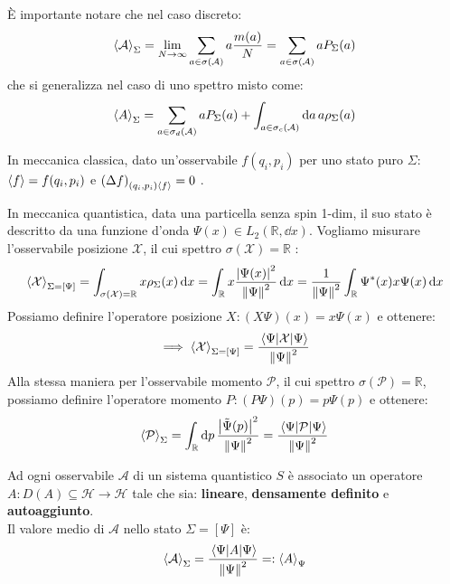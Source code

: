 È importante notare che nel caso discreto: 
\begin{equation}
    \expval{\mathcal{A}}_\Sigma = \lim_{N\to \infty} \sum_{a \in \sigma(\mathcal{A})} a \frac{m(a)}{N} = \sum_{a \in \sigma(\mathcal{A})} a P_\Sigma(a)
\end{equation}
che si generalizza nel caso di uno spettro misto come:
\begin{equation}
    \expval{A}_\Sigma = \sum_{a \in \sigma_d(\mathcal{A})} a P_\Sigma(a) + \int_{a \in \sigma_c(\mathcal{A}) } \dd{a} a \rho_\Sigma(a)
\end{equation}
\begin{example}
    In meccanica classica, dato un'osservabile \(f(q_i,p_i)\) per uno stato puro \(\Sigma\): 
    \(\expval{f}= f(q_i, p_i)\) e \(\left( \Delta f \right)_{(q_i,p_i) \expval{f}}=0\) .
\end{example}

\begin{example}
    In meccanica quantistica, data una particella senza spin 1-dim, il suo stato è descritto da una funzione d'onda \(\Psi(x) \in L_2(\mathbb{R}, \dd{x})\).
    Vogliamo misurare l'osservabile posizione \(\mathcal{X}\), il cui spettro \(\sigma(\mathcal{X}) = \mathbb{R}\) :
    \[
        \expval{\mathcal{X}}_{\Sigma= [\Psi]} = \int_{\sigma(\mathcal{X})= \mathbb{R}} x\rho_\Sigma(x) \dd{x} = \int_{\mathbb{R}} x \frac{\abs{\Psi(x)}^2}{\norm{\Psi}^2} \dd{x}= 
        \frac{1}{\norm{\Psi}^2} \int_{\mathbb{R}} \Psi^*(x) x \Psi(x) \dd{x}
    \]
    Possiamo definire l'operatore posizione \(X: (X\Psi)(x)= x\Psi(x)\) e ottenere:
    \begin{equation}
        \implies \expval{\mathcal{X}}_{\Sigma= [\Psi]} = \frac{\expval{\mathcal{X}}{\Psi}}{\norm{\Psi}^2}
    \end{equation}
    Alla stessa maniera per l'osservabile momento \(\mathcal{P}\), il cui spettro \(\sigma(\mathcal{P})= \mathbb{R}\),
    possiamo definire l'operatore momento \(P: (P\Psi)(p)= p\Psi(p)\) e ottenere:
    \begin{equation}
        \expval{\mathcal{P}}_{\Sigma} = \int_{\mathbb{R}} \dd{p} \frac{\abs{\tilde{\Psi}(p)}^2}{\norm{\Psi}^2}= \frac{\expval{\mathcal{P}}{\Psi}}{\norm{\Psi}^2}
    \end{equation}

\end{example}

\begin{postulato2}
    Ad ogni osservabile \(\mathcal{A}\) di un sistema quantistico \(S\) è associato un operatore \(A: D(A) \subseteq \mathcal{H} \to \mathcal{H}\) tale che sia:
    \textbf{lineare}, \textbf{densamente definito} e \textbf{autoaggiunto}. \\
    Il valore medio di \(\mathcal{A}\) nello stato \(\Sigma = [\Psi]\) è:
    \begin{equation}
        \expval{\mathcal{A}}_\Sigma = \frac{\expval{A}{\Psi}}{\norm{\Psi}^2} =: \expval{A}_\Psi
    \end{equation}
\end{postulato2}


